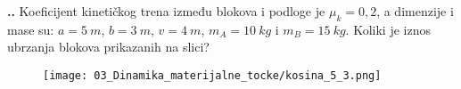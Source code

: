 
\noindent 
\textbf{
\thecjelina.\thezadatak.}
Koeficijent kinetičkog trena između blokova i podloge je $\mu_k=0,2$, a dimenzije i mase su: $a=5\ m$, $b=3\ m$, $v=4\ m$, $m_A=10\ kg$ i $m_B=15\ kg$.
Koliki je iznos ubrzanja blokova prikazanih na slici?
\begin{figure}[ht]%
  \begin{center}
    \texttt{[image: 03\_Dinamika\_materijalne\_tocke/kosina\_5\_3.png]}
  \end{center}
\end{figure}

